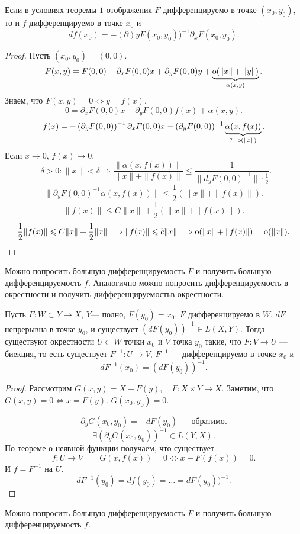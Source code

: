 \begin{thm}
    Если в условиях теоремы $ 1$ отображения  $ F$ дифференцируемо в точке  $ (x_0, y_0)$, то и $ f$ дифференцируемо в точке  $ x_0$ и 
    \[
	df(x_0) = -(\partial )yF(x_0, y_0))^{-1} \partial _x F(x_0, y_0)
    .\] 
\end{thm}
\begin{proof}
    Пусть $ (x_0, y_0) = (0, 0)$.
    \[
	F(x, y) = F(0, 0) - \partial _xF(0, 0)x + \partial _yF(0, 0) y +\underbrace{{\mathop{\text{\rm o}}}(\| x \|+ \|  y \| ) }_{\alpha (x, y)}
    .\] 
    Знаем, что $ F(x, y) = 0 \Longleftrightarrow y = f(x)$.
    \[
	0 = \partial _xF(0, 0) x + \partial _y F(0, 0)f(x) + \alpha (x, y)
    .\] 
    \[
	f(x) = -\left( \partial _y F(0, 0) \right)^{-1}\partial _x F(0, 0) x - (\partial _y F(0, 0))^{-1} \underbrace{\alpha (x, f(x))}_{?= {\mathop{\text{\rm o}}}(\| x \| )}
    .\] 
    Если $ x \to  0$, $ f(x) \to  0$.
    \[
	\exists \delta > 0\colon \|  x  \| < \delta \Longrightarrow \frac{ \|  \alpha (x, f(x))  \|}{\| x \| + \|  f(x) \| }  \le \frac{1}{\|  d_yF(0, 0)^{-1} \| \cdot \frac{1}{2} }
    .\] 
    \[
	\|  \partial _yF(0, 0)^{-1} \alpha (x, f(x)) \| \le \frac{1}{2}\left( \|  x \| + \|  f(x) \|  \right)  
    .\] 
    \[
	\| f(x) \| \le C \| x \| + \frac{1}{2} \left( \| x \| + \| f(x) \|   \right)  
    .\] 
    \[
	\frac{1}{2}\|  f(x) \| \leqslant  C \|  x \| + \frac{1}{2}  \| x \| \Longrightarrow  \| f(x)  \|\leqslant \widetilde{ c} \| x \|  \Longrightarrow  {\mathop{\text{\rm o}}}(\| x \|+\| f(x) \|) = {\mathop{\text{\rm o}}}(\| x \| )  
    .\] 
\end{proof}
\begin{note}
    Можно попросить большую дифференцируемость $ F$ и получить большую дифференцируемость  $ f$.  Аналогично можно попросить дифференцируемость в окрестности и получить дифференцируемостьв окрестности.
\end{note}
\begin{thm}
    Пусть  $ F\colon W \subset Y \to  X$, $ Y$--- полно, $ F(y_0) = x_0$, $ F$ дифференцируемо в  $ W$, $ dF$ непрерывна в точке   $ y_0$, и существует  $ \left( dF(y_0) \right)^{-1} \in L(X, Y) $. Тогда существуют окрестности $ U \subset W$ точки $ x_0 $ и $ V$ точка  $ y_0$ такие, что $ F \colon V \to  U$ --- биекция, то есть существует $ F^{-1} \colon U \to  V$, $ F ^{-1}$ --- дифференцируемо  в точке $ x_0$ и 
    \[
	dF^{-1}(x_0) = \left( dF(y_0) \right)^{-1}
    .\] 
\end{thm}
\begin{proof}
    Рассмотрим $ G(x, y) = X - F(y), \quad F\colon X \times Y \to  X$.
    Заметим, что $ G(x, y) = 0 \Longleftrightarrow x = F(y)$. 
    $ G(x_0, y_0) = 0$.

    \[
	\partial _yG(x_0, y_0) = -dF(y_0) \text{ --- обратимо}
    .\] 
    \[
	\exists (\partial _yG(x_0, y_0))^{-1} \in L(Y, X)
    .\] 
    По теореме о неявной функции получаем, что существует 
    \[
	f\colon U \to  V \qquad G(x, f(x) ) = 0 \Longleftrightarrow x - F(f(x))= 0
    .\] 
    И  $ f = F^{-1}$ на  $ U$.
    \[
	dF^{-1}(y_0) = df(y_0) = \ldots = dF(y_0))^{-1}
    .\] 
\end{proof}
\begin{note}
    Можно попросить большую дифференцируемость $ F$ и получить большую дифференцируемость  $ f$.
\end{note}
% 
